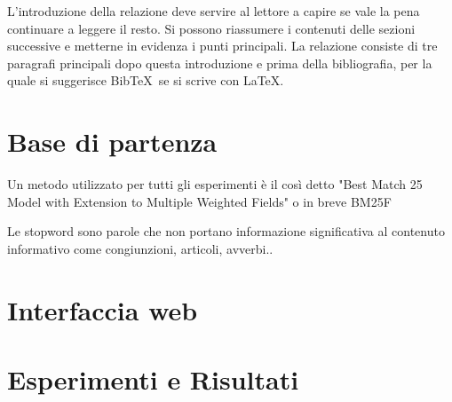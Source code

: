 \documentclass[runningheads]{llncs}
\begin{document}
L'introduzione della relazione deve servire al lettore a capire se
vale la pena continuare a leggere il resto.  Si possono riassumere i
contenuti delle sezioni successive e metterne in evidenza i punti
principali.  La relazione consiste di tre paragrafi principali dopo
questa introduzione e prima della bibliografia, per la quale si
suggerisce Bib\TeX\ se si scrive con \LaTeX.

\section{Base di partenza}
\label{sec:base-di-partenza}

Un metodo utilizzato per tutti gli esperimenti \`e il cos\`i detto
"Best Match 25 Model with Extension to Multiple Weighted Fields" o in breve BM25F


Le stopword\cite{WBC_stopword} sono parole che non portano informazione
significativa al contenuto informativo come congiunzioni, articoli, avverbi..\par

%
%


\section{Interfaccia web}


\section{Esperimenti e Risultati}
\label{sec:esperimenti}
\end{document}
